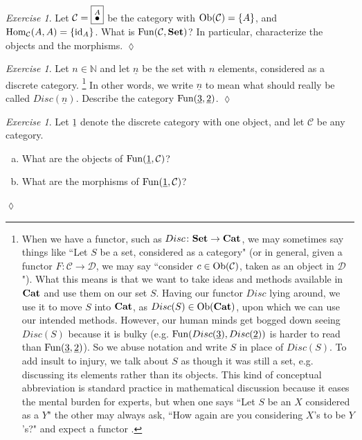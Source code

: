 \documentclass{book}
\def\tn{\textnormal}
\def\mc{\mathcal}
\def\NN{{\mathbb N}}
\def\Hom{\tn{Hom}}
\def\Fun{\tn{Fun}}
\def\Ob{\tn{Ob}}
\def\to{\rightarrow}
\def\taking{\colon}
\def\ul{\underline}
\newcommand{\LMO}[1]{\stackrel{#1}{\bullet}}
\def\id{\tn{id}}
\def\Cat{{\bf Cat}}
\def\Set{{\bf Set}}
\def\mcC{\mc{C}}
\def\mcD{\mc{D}}
\theoremstyle{remark}
\newtheorem{exc}[subsubsection]{Exercise}
\newenvironment{exercise}{\begin{exc}}{\hspace*{\fill}$\lozenge$\end{exc}}
\theoremstyle{definition}
\def\sexc{\begin{enumerate}[a.)]\setlength{\itemsep}{.1cm}\setlength{\parskip}{.1cm}\item}
\def\next{\item}
\def\endsexc{\end{enumerate}}
\begin{document}
\begin{exercise}
Let $\mcC=\fbox{$\LMO{A}$}$ be the category with $\Ob(\mcC)=\{A\}$, and $\Hom_\mcC(A,A)=\{\id_A\}$. What is $\Fun(\mcC,\Set)$? In particular, characterize the objects and the morphisms.
\end{exercise}

\begin{exercise}
Let $n\in\NN$ and let $\ul{n}$ be the set with $n$ elements, considered as a discrete category.
\footnote{When we have a functor, such as $Disc\taking\Set\to\Cat$, we may sometimes say things like ``Let $S$ be a set, considered as a category" (or in general, given a functor $F\taking\mcC\to\mcD$, we may say ``consider $c\in\Ob(\mcC)$, taken as an object in $\mcD$"). What this means is that we want to take ideas and methods available in $\Cat$ and use them on our set $S$. Having our functor $Disc$ lying around, we use it to move $S$ into $\Cat$, as $Disc(S)\in\Ob(\Cat)$, upon which we can use our intended methods. However, our human minds get bogged down seeing $Disc(S)$ because it is bulky (e.g. $\Fun(Disc(\ul{3}),Disc(\ul{2}))$ is harder to read than $\Fun(\ul{3},\ul{2})$). So we abuse notation and write $S$ in place of  $Disc(S)$. To add insult to injury, we talk about $S$ as though it was still a set, e.g. discussing its elements rather than its objects. This kind of conceptual abbreviation is standard practice in mathematical discussion because it eases the mental burden for experts, but when one says ``Let $S$ be an $X$ considered as a $Y$" the other may always ask, ``How again are you considering $X$'s to be $Y$'s?" and expect a functor .}
In other words, we write $\ul{n}$ to mean what should really be called $Disc(\ul{n})$. Describe the category $\Fun(\ul{3},\ul{2})$.
\end{exercise}

\begin{exercise}
Let $\ul{1}$ denote the discrete category with one object, and let $\mcC$ be any category.
\sexc What are the objects of $\Fun(\ul{1},\mcC)$?
\next What are the morphisms of $\Fun(\ul{1},\mcC)$?
\endsexc
\end{exercise}
\end{document}
